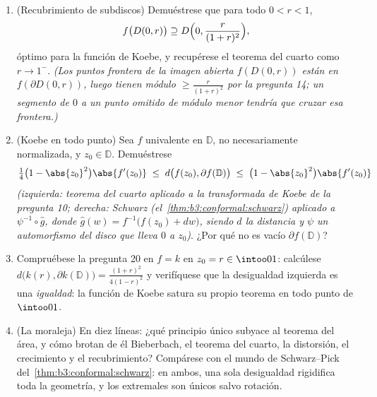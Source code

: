 \begin{problem}
\begin{enumerate}[resume]
\[        \]
        (De Branges, 1985: $\abs{a_n} \leq n$; el factor $\eu n$ es el
        precio de las herramientas elementales.) \item (Recubrimiento de
        subdiscos) Demuéstrese que para todo $0 < r <
        1$,
        \[
        f\bigl(D(0, r)\bigr) \supseteq
        D\Bigl(0, \frac{r}{(1 + r)^2}\Bigr),
        \]
        óptimo para la función de Koebe, y recupérese el teorema del
        cuarto como $r \to 1^-$. \emph{(Los puntos frontera de la imagen
        abierta $f(D(0,r))$ están en $f(\partial D(0,r))$, luego tienen
        módulo $\geq
        \frac{r}{(1+r)^2}$ por la pregunta 14; un segmento de $0$ a un
        punto omitido de módulo menor tendría que cruzar esa frontera.)}
        \item (Koebe en todo punto) Sea $f$ univalente en $\mathbb D$,
        no necesariamente normalizada, y $z_0
        \in \mathbb D$. Demuéstrese
        \[
        \tfrac14\bigl(1 - \abs{z_0}^2\bigr)\abs{f'(z_0)}
        \;\leq\;
        d\bigl(f(z_0), \partial f(\mathbb D)\bigr)
        \;\leq\;
        \bigl(1 - \abs{z_0}^2\bigr)\abs{f'(z_0)}
        \]
        \emph{(izquierda: teorema del cuarto aplicado a la transformada
        de Koebe de la pregunta 10; derecha: Schwarz
        (el~\cref{thm:b3:conformal:schwarz}) aplicado a
        $\psi^{-1}\circ\hat g$, donde $\hat g(w) =
        f^{-1}\bigl(f(z_0) + dw\bigr)$, siendo $d$ la distancia y $\psi$
        un automorfismo del disco que lleva $0$ a $z_0$)}. ¿Por qué no
        es vacío $\partial f(\mathbb D)$? \item Compruébese la pregunta
        20 en $f = k$ en $z_0 = r \in
        \intoo01$: calcúlese $d\bigl(k(r), \partial k(\mathbb
        D)\bigr) = \frac{(1+r)^2}{4(1-r)^2}$ y verifíquese que la
        desigualdad izquierda es una \emph{igualdad}: la función de
        Koebe satura su propio teorema en todo punto de
        $\intoo01$.
  \item (La moraleja) En diez líneas: ¿qué principio único subyace al
  teorema del área, y cómo brotan de él Bieberbach, el teorema del
  cuarto, la distorsión, el crecimiento y el recubrimiento? Compárese
  con el mundo de Schwarz--Pick del~\cref{thm:b3:conformal:schwarz}: en
  ambos, una sola desigualdad
   rigidifica toda la
  geometría, y los extremales son únicos salvo rotación.


\end{enumerate}
\end{problem}
